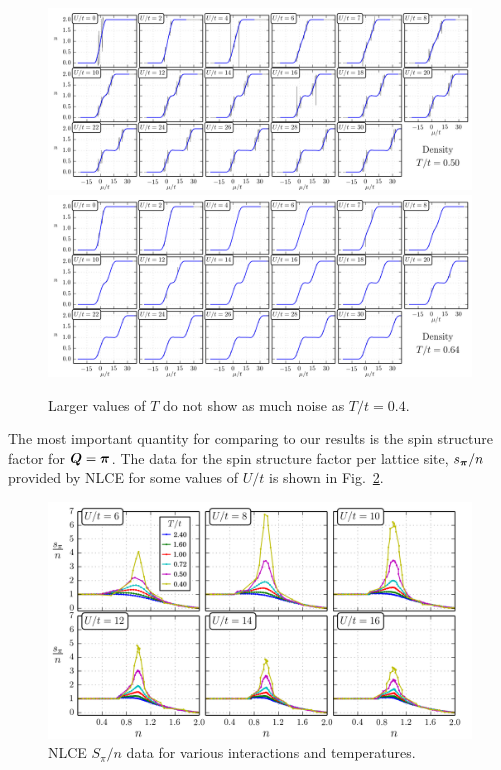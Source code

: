 \begin{figure}
    \centering
\includegraphics[width=1.0\textwidth]{../figures/hubbard-data/dataplots/NLCE8_Final/density/T0_50.png}
\includegraphics[width=1.0\textwidth]{../figures/hubbard-data/dataplots/NLCE8_Final/density/T0_64.png}
\caption{Larger values of $T$ do not show as much noise as $T/t=0.4$.}
\label{fig:NLCE_Thigher}
\end{figure}


The most important quantity for comparing to our results is the spin structure
factor for $\bm{Q}=\bm{\pi}$.   The data for the spin structure factor per
lattice site, $s_{\bm{\pi}}/n$ provided by NLCE for some values of $U/t$ is
shown in Fig.~\ref{fig:NLCESpin}.  

\begin{figure}
    \centering
\includegraphics[width=\textwidth]{../figures/hubbard-data/dataplots/NLCE8_Final/Spi_varyU_varyT.png}
\caption{NLCE $S_{\pi}/n$  data for various interactions and temperatures.  }
\label{fig:NLCESpin}
\end{figure}


